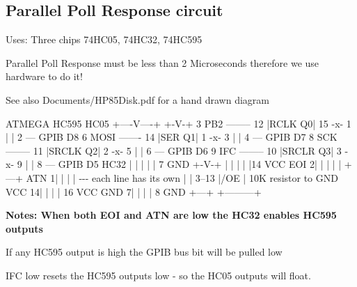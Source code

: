 {\begin{DoxyItemize}
\end{DoxyItemize}}

{\bfseries 

}

{\bfseries \subsection*{Parallel Poll Response circuit}}

{\bfseries 
\begin{DoxyItemize}
\item Uses\+: Three chips 74\+H\+C05, 74\+H\+C32, 74\+H\+C595
\item Parallel Poll Response must be less than 2 Microseconds therefore we use hardware to do it!
\item \begin{DoxySeeAlso}{See also}
Documents/\+H\+P85\+Disk.\+pdf for a hand drawn diagram
\end{DoxySeeAlso}

\begin{DoxyPre}
    ATMEGA               HC595             HC05 
                      +----V----+          +-V-+  
    3 PB2 -------- 12 |RCLK   Q0| 15 -x- 1 |   | 2 --- GPIB D8 
    6 MOSI ------- 14 |SER    Q1| 1  -x- 3 |   | 4 --- GPIB D7 
    8 SCK -------- 11 |SRCLK  Q2| 2  -x- 5 |   | 6 --- GPIB D6 
    9 IFC -------- 10 |SRCLR  Q3| 3  -x- 9 |   | 8 --- GPIB D5 
           HC32       |         |     |    |   | 7 GND 
          +-V-+       |         |     |    |   |14 VCC 
     EOI 2|   |       |         |     |    +---+ 
     ATN 1|   |       |         |     -\/-\/-\/ each line has its own 
          |   | 3--13 |/OE      |          10K resistor to GND 
    VCC 14|   |       |         | 16 VCC 
    GND  7|   |       |         |  8 GND 
          +---+       +---------+ 
\end{DoxyPre}

\end{DoxyItemize}}

{\bfseries Notes\+: When both E\+OI and A\+TN are low the H\+C32 enables H\+C595 outputs
\begin{DoxyItemize}
\item If any H\+C595 output is high the G\+P\+IB bus bit will be pulled low
\item I\+FC low resets the H\+C595 outputs low -\/ so the H\+C05 outputs will float.
\end{DoxyItemize}}

{\bfseries 

}

